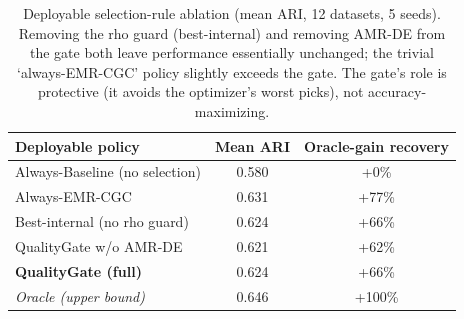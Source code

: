 \begin{table}[htbp]
\centering
\caption{Deployable selection-rule ablation (mean ARI, 12 datasets, 5 seeds). Removing the rho guard (best-internal) and removing AMR-DE from the gate both leave performance essentially unchanged; the trivial `always-EMR-CGC' policy slightly exceeds the gate. The gate's role is protective (it avoids the optimizer's worst picks), not accuracy-maximizing.}
\label{tab:selection}
\footnotesize
\begin{tabular}{lcc}
\toprule
Deployable policy & Mean ARI & Oracle-gain recovery \\
\midrule
Always-Baseline (no selection) & 0.580 & +0\% \\
Always-EMR-CGC & 0.631 & +77\% \\
Best-internal (no rho guard) & 0.624 & +66\% \\
QualityGate w/o AMR-DE & 0.621 & +62\% \\
\textbf{QualityGate (full)} & 0.624 & +66\% \\
\textit{Oracle (upper bound)} & 0.646 & +100\% \\
\bottomrule
\end{tabular}
\end{table}
